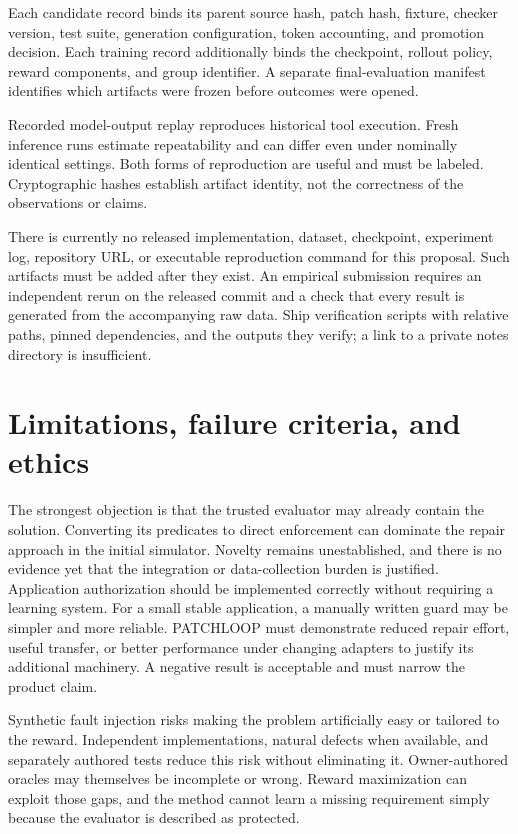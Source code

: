 \documentclass[11pt,a4paper]{article}
\begin{document}
Each candidate record binds its parent source hash, patch hash, fixture, checker version, test suite, generation configuration, token accounting, and promotion decision. Each training record additionally binds the checkpoint, rollout policy, reward components, and group identifier. A separate final-evaluation manifest identifies which artifacts were frozen before outcomes were opened.

Recorded model-output replay reproduces historical tool execution. Fresh inference runs estimate repeatability and can differ even under nominally identical settings. Both forms of reproduction are useful and must be labeled. Cryptographic hashes establish artifact identity, not the correctness of the observations or claims.

There is currently no released implementation, dataset, checkpoint, experiment log, repository URL, or executable reproduction command for this proposal. Such artifacts must be added after they exist. An empirical submission requires an independent rerun on the released commit and a check that every result is generated from the accompanying raw data. Ship verification scripts with relative paths, pinned dependencies, and the outputs they verify; a link to a private notes directory is insufficient.

\section{Limitations, failure criteria, and ethics}
The strongest objection is that the trusted evaluator may already contain the solution. Converting its predicates to direct enforcement can dominate the repair approach in the initial simulator. Novelty remains unestablished, and there is no evidence yet that the integration or data-collection burden is justified. Application authorization should be implemented correctly without requiring a learning system. For a small stable application, a manually written guard may be simpler and more reliable. PATCHLOOP must demonstrate reduced repair effort, useful transfer, or better performance under changing adapters to justify its additional machinery. A negative result is acceptable and must narrow the product claim.

Synthetic fault injection risks making the problem artificially easy or tailored to the reward. Independent implementations, natural defects when available, and separately authored tests reduce this risk without eliminating it. Owner-authored oracles may themselves be incomplete or wrong. Reward maximization can exploit those gaps, and the method cannot learn a missing requirement simply because the evaluator is described as protected.
\end{document}
